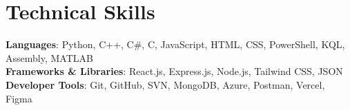 \section{Technical Skills}
 \begin{itemize}[leftmargin=0.15in, label={}]
    \small{\item{
      \textbf{Languages}{: Python, C++, C\#, C, JavaScript, HTML, CSS, PowerShell, KQL, Assembly, MATLAB} \\
      \textbf{Frameworks \& Libraries}{: React.js, Express.js, Node.js, Tailwind CSS, JSON} \\
      \textbf{Developer Tools}{: Git, GitHub, SVN, MongoDB, Azure, Postman, Vercel, Figma} \\
      }}
\end{itemize} 